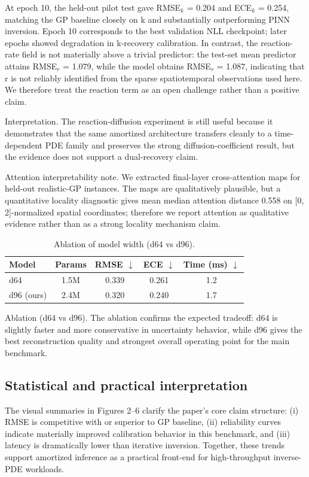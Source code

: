\documentclass{article}
\begin{document}
At epoch 10, the held-out pilot test gave RMSE$_k$ = 0.204 and ECE$_k$ = 0.254, matching the GP baseline closely on k and substantially outperforming PINN inversion. Epoch 10 corresponds to the best validation NLL checkpoint; later epochs showed degradation in k-recovery calibration. In contrast, the reaction-rate field is not materially above a trivial predictor: the test-set mean predictor attains RMSE$_r$ = 1.079, while the model obtains RMSE$_r$ = 1.087, indicating that r is not reliably identified from the sparse spatiotemporal observations used here. We therefore treat the reaction term as an open challenge rather than a positive claim.

Interpretation. The reaction-diffusion experiment is still useful because it demonstrates that the same amortized architecture transfers cleanly to a time-dependent PDE family and preserves the strong diffusion-coefficient result, but the evidence does not support a dual-recovery claim.

Attention interpretability note. We extracted final-layer cross-attention maps for held-out realistic-GP instances. The maps are qualitatively plausible, but a quantitative locality diagnostic gives mean median attention distance 0.558 on [0, 2]-normalized spatial coordinates; therefore we report attention as qualitative evidence rather than as a strong locality mechanism claim.

\begin{table}[H]
\centering
\caption{Ablation of model width (d64 vs d96).}
\begin{tabular}{lcccc}
\toprule
Model & Params & RMSE $\downarrow$ & ECE $\downarrow$ & Time (ms) $\downarrow$ \\
\midrule
d64 & 1.5M & 0.339 & 0.261 & 1.2 \\
d96 (ours) & 2.4M & 0.320 & 0.240 & 1.7 \\
\bottomrule
\end{tabular}
\end{table}

Ablation (d64 vs d96). The ablation confirms the expected tradeoff: d64 is slightly faster and more conservative in uncertainty behavior, while d96 gives the best reconstruction quality and strongest overall operating point for the main benchmark.

\subsection{Statistical and practical interpretation}
The visual summaries in Figures 2--6 clarify the paper's core claim structure: (i) RMSE is competitive with or superior to GP baseline, (ii) reliability curves indicate materially improved calibration behavior in this benchmark, and (iii) latency is dramatically lower than iterative inversion. Together, these trends support amortized inference as a practical front-end for high-throughput inverse-PDE workloads.
\end{document}
